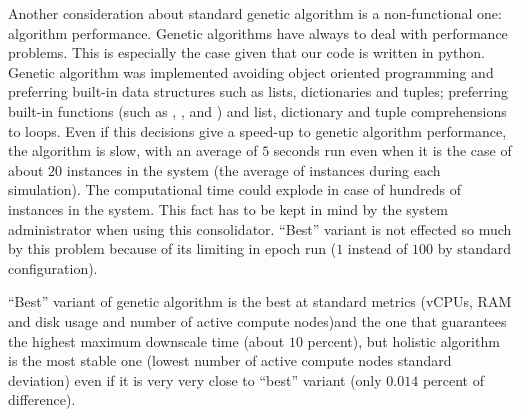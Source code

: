 Another consideration about standard genetic algorithm is a non-functional one: algorithm performance. Genetic algorithms have always to deal with performance problems. This is especially the case given that our code is written in python. Genetic algorithm was implemented avoiding object oriented programming and preferring built-in data structures such as lists, dictionaries and tuples; preferring built-in functions (such as , ,  and ) and list, dictionary and tuple comprehensions to  loops. Even if this decisions give a speed-up to genetic algorithm performance, the algorithm is slow, with an average of $5$ seconds run even when it is the case of about $20$ instances in the system (the average of instances during each simulation). The computational time could explode in case of hundreds of instances in the system. This fact has to be kept in mind by the system administrator when using this consolidator. ``Best'' variant is not effected so much by this problem because of its limiting in epoch run ($1$ instead of $100$ by standard configuration).

``Best'' variant of genetic algorithm is the best at standard metrics (vCPUs, RAM and disk usage and number of active compute nodes)and the one that guarantees the highest maximum downscale time (about $10$ percent), but holistic algorithm is the most stable one (lowest number of active compute nodes standard deviation) even if it is very very close to ``best'' variant (only $0.014$ percent of difference).